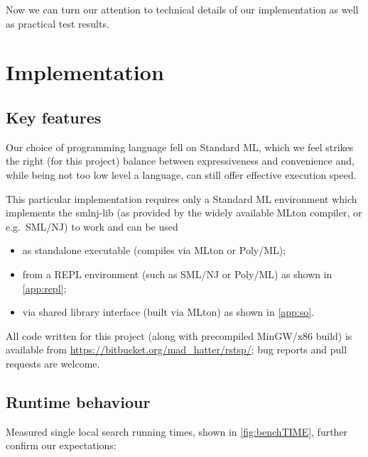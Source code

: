 \documentclass[index=totoc,bibliography=totoc]{scrartcl}
\numberwithin{equation}{section}
\numberwithin{figure}{section}
\numberwithin{table}{section}
\begin{document}
Now we can turn our attention to technical details of our implementation
as well as practical test results.


\section{Implementation}
\vspace{0.87em}

\subsection{Key features}

Our choice of programming language fell on Standard ML, which we feel
strikes the right (for this project) balance between expressiveness and
convenience and, while being not too low level a language, can still offer
effective execution speed.

This particular implementation requires only a Standard ML environment
which implements the {\ttfamily smlnj-lib}
(as provided by the widely available {\ttfamily MLton} compiler, or e.g.\ {\ttfamily SML/NJ})
to work and can be used
\begin{itemize}
  \item as standalone executable
    (compiles via {\ttfamily MLton} or {\ttfamily Poly/ML});
  \item from a REPL environment
    (such as {\ttfamily SML/NJ} or {\ttfamily Poly/ML})
    as shown in \autoref{app:repl};
  \item via shared library interface
    (built via {\ttfamily MLton}) as shown in \autoref{app:so}.
\end{itemize}

All code written for this project
(along with precompiled {\ttfamily MinGW/x86} build)
is available from \url{https://bitbucket.org/mad_hatter/rstsp/};
bug reports and pull requests are welcome.

\subsection{Runtime behaviour}

Measured single local search running times, shown in \cref{fig:benchTIME},
further confirm our expectations:
\end{document}
